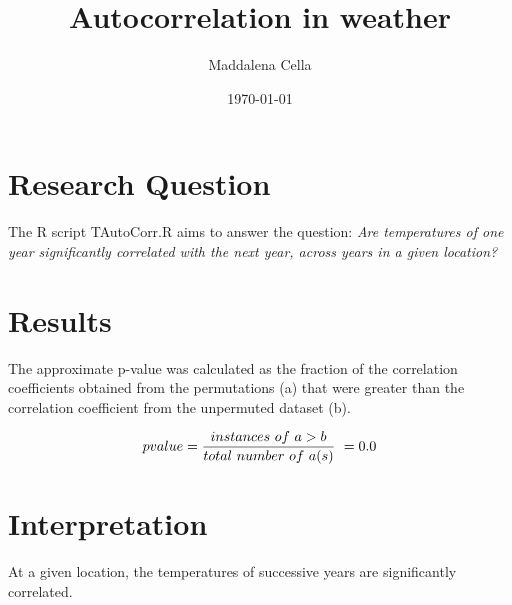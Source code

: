 \documentclass[12pt,letterpaper] {article}
\title {Autocorrelation in weather}
\author {Maddalena Cella}
\date {\today}
\begin{document}
  \maketitle

  \section{Research Question}
  The R script TAutoCorr.R aims to answer the question: \textit{Are temperatures of one year significantly 
  correlated with the next year, across years in a given location?} 

  \section{Results}
  The approximate p-value was calculated as the fraction of the correlation coefficients obtained from the
  permutations (a) that were greater than the correlation coefficient from the unpermuted dataset (b).

  \begin{equation*}
    pvalue = \frac{instances\ of\ a > b}{total\ number\ of\ a(s)}\ = 0.0\\
  \end{equation*}

  \section{Interpretation}
  At a given location, the temperatures of successive years are significantly correlated.
\end{document}
